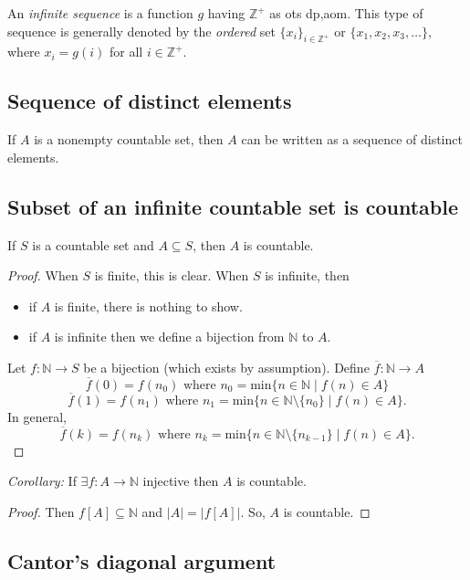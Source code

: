\documentclass[11pt]{article}
\begin{document}
    An \emph{infinite sequence} is a function $g$ having \(\mathbb{Z}^+\) as ots dp,aom. This type of sequence is generally denoted by the \emph{ordered} set \(\{x_i\}_{i \in \mathbb{Z}^+}\) or \(\{x_1, x_2, x_3, \dots\}\), where \(x_i = g(i)\) for all \(i \in \mathbb{Z}^+\).

    \subsection{Sequence of distinct elements}

    If $A$ is a nonempty countable set, then $A$ can be written as a sequence of distinct elements.

    \subsection{Subset of an infinite countable set is countable}

    If $S$ is a countable set and \(A \subseteq S\), then $A$ is countable. 

    \begin{proof}
        When $S$ is finite, this is clear. When $S$ is infinite, then
        \begin{itemize}
            \item if $A$ is finite, there is nothing to show.
            \item if $A$ is infinite then we define a bijection from \(\mathbb{N}\) to $A$. 
        \end{itemize}
        Let \(f: \mathbb{N} \rightarrow S\) be a bijection (which exists by assumption). Define \(\overline{f}:\mathbb{N} \rightarrow A\) \[\overline{f}(0) = f(n_0) \text{ where } n_0 = \text{min} \{n \in \mathbb{N} \mid f(n) \in A\}\] \[\overline{f}(1) = f(n_1) \text{ where } n_1 = \text{min}\{n \in \mathbb{N} \setminus \{n_0\} \mid f(n) \in A\}.\] In general, \[\overline{f}(k) = f(n_k) \text{ where } n_k = \text{min} \{n \in \mathbb{N} \setminus \{n_{k-1}\} \mid f(n) \in A\}.\]
    \end{proof}

    \emph{Corollary:} If \(\exists f: A \rightarrow \mathbb{N}\) injective then $A$ is countable.

    \begin{proof}
        Then \(f[A] \subseteq \mathbb{N}\) and \(|A| = |f[A]|\). So, $A$ is countable.
    \end{proof}

    \subsection{Cantor's diagonal argument}
\end{document}
